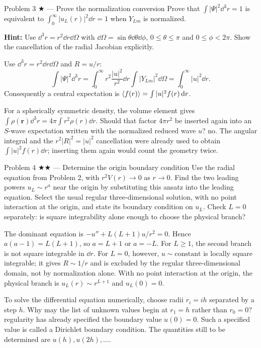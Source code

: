 \documentclass[11pt]{article}
\begin{document}
\begin{problem}{Problem 3 ★ — Prove the normalization conversion}
Prove that $\int |\Psi|^2\dd^3r=1$ is equivalent to
$\int_0^\infty |u_L(r)|^2\dd r=1$ when $Y_{Lm}$ is normalized.

\textbf{Hint:} Use $\dd^3r=r^2\dd r\dd\Omega$ with
$\dd\Omega=\sin\theta\dd\theta\dd\phi$, $0\le\theta\le\pi$ and
$0\le\phi<2\pi$. Show the cancellation of the radial Jacobian explicitly.
\end{problem}
\begin{solution}
Use $\dd^3r=r^2\dd r\dd\Omega$ and $R=u/r$:
\[
\int|\Psi|^2\dd^3r=\int_0^\infty r^2\frac{|u|^2}{r^2}\dd r
\int|Y_{Lm}|^2\dd\Omega=\int_0^\infty|u|^2\dd r.
\]
Consequently a central expectation is $\left\langle f(r)\right\rangle=\int|u|^2f(r)\,\mathrm d r$.
\end{solution}
\begin{quiz}
For a spherically symmetric density, the volume element gives
$\int\rho(\bm r)\dd^3r=4\pi\int r^2\rho(r)\dd r$. Should that factor
$4\pi r^2$ be inserted again into an $S$-wave expectation written with the
normalized reduced wave $u$? \answer no. The angular integral and the
$r^2|R|^2=|u|^2$ cancellation were already used to obtain
$\int|u|^2f(r)\dd r$; inserting them again would count the geometry twice.
\end{quiz}

\begin{problem}{Problem 4 ★★ — Determine the origin boundary condition}
Use the radial equation from Problem 2, with $r^2V(r)\to0$ as $r\to0$.
Find the two leading powers $u_L\sim r^a$ near the origin by substituting this
ansatz into the leading equation. Select the usual regular three-dimensional
solution, with no point interaction at the origin, and state its boundary
condition on $u_L$. Check $L=0$ separately: is square integrability alone enough
to choose the physical branch?
\end{problem}
\begin{solution}
The dominant equation is $-u''+L(L+1)u/r^2=0$. Hence
$a(a-1)=L(L+1)$, so $a=L+1$ or $a=-L$. For $L\ge1$, the second branch is not square integrable in $\dd r$.
For $L=0$, however, $u\sim\mathrm{constant}$ is locally square integrable;
it gives $R\sim1/r$ and is excluded by the regular three-dimensional domain,
not by normalization alone. With no point interaction at the origin, the
physical branch is $u_L(r)\sim r^{L+1}$ and $u_L(0)=0$.
\end{solution}
\begin{quiz}
To solve the differential equation numerically, choose radii
$r_i=ih$ separated by a step $h$. Why may the list of unknown values begin at
$r_1=h$ rather than $r_0=0$? \answer regularity has already specified the
boundary value $u(0)=0$. Such a specified value is called a Dirichlet boundary
condition. The quantities still to be determined are $u(h),u(2h),\ldots$.
\end{quiz}
\end{document}
